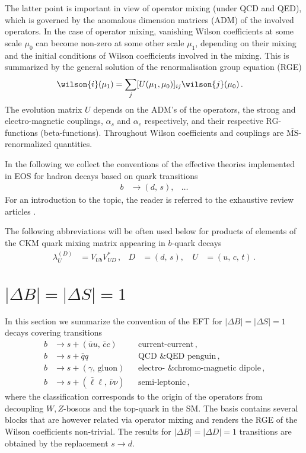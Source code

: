 The latter point
is important in view of operator mixing (under QCD and QED), which is governed by
the anomalous dimension matrices (ADM) of the involved operators. In the case of
operator mixing, vanishing Wilson coefficients at some scale $\mu_0$ can become 
non-zero at some other scale $\mu_1$, depending on their mixing and the initial
conditions of Wilson coefficients involved in the mixing. This is summarized
by the general solution of the renormalisation group equation (RGE)
\begin{align}
  \wilson{i}(\mu_1) & = \sum_j [U(\mu_1, \mu_0)]_{ij} \wilson{j}(\mu_0)\,.
\end{align}
The evolution matrix $U$ depends on the ADM's of the operators, the strong
and electro-magnetic couplings, $\alpha_s$ and $\alpha_e$ respectively, and
their respective RG-functions (beta-functions). Throughout Wilson coefficients
and couplings are $\overline{\text{MS}}$-renormalized quantities.

In the following we collect the conventions of the effective theories implemented
in EOS for hadron decays based on quark transitions
\begin{align}
  b & \to (d,\, s), & \ldots
\end{align}
For an introduction to the topic, the reader is referred to the exhaustive review
articles \cite{Buchalla:1995vs, Buras:1998raa}. 

The following abbreviations will be often used below for products of elements
of the CKM quark mixing matrix appearing in $b$-quark decays
\begin{align}
  \lambda_U^{(D)} & = V_{Ub}^{} V_{UD}^* \,, &
  D & = (d,\,s), \, &
  U & = (u,\,c,\,t) \,.
\end{align}

%
%

\section{$|\Delta B| = |\Delta S| = 1$}

In this section we summarize the convention of the EFT for $|\Delta B| = |\Delta S| = 1$
decays covering transitions
\begin{align*}
  b & \to s + (\bar{u}u,\, \bar{c}c)           && \mbox{current-current} \,,
\\
  b & \to s + \bar{q}q                         && \mbox{QCD \& QED penguin} \,,
\\
  b & \to s + (\gamma,\, \mbox{gluon})         && \mbox{electro- \& chromo-magnetic dipole} \,,
\\
  b & \to s + (\bar{\ell}\ell,\, \bar{\nu}\nu) && \mbox{semi-leptonic} \,,
\end{align*}
where the classification corresponds to the origin of the operators from 
decoupling $W,Z$-bosons and the top-quark in the SM. The basis contains several
blocks that are however related via operator mixing and renders the RGE of the
Wilson coefficients non-trivial. The results for $|\Delta B| = |\Delta D| = 1$
transitions are obtained by the replacement $s\to d$.
 

